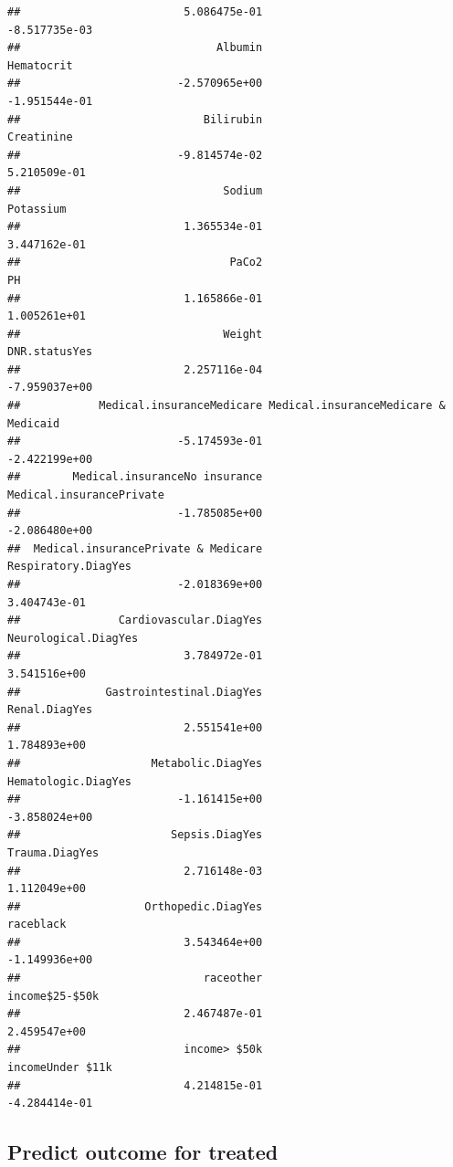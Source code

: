 \documentclass[
]{book}
\begin{document}
\begin{verbatim}
##                         5.086475e-01                        -8.517735e-03 
##                              Albumin                           Hematocrit 
##                        -2.570965e+00                        -1.951544e-01 
##                            Bilirubin                           Creatinine 
##                        -9.814574e-02                         5.210509e-01 
##                               Sodium                            Potassium 
##                         1.365534e-01                         3.447162e-01 
##                                PaCo2                                   PH 
##                         1.165866e-01                         1.005261e+01 
##                               Weight                        DNR.statusYes 
##                         2.257116e-04                        -7.959037e+00 
##            Medical.insuranceMedicare Medical.insuranceMedicare & Medicaid 
##                        -5.174593e-01                        -2.422199e+00 
##        Medical.insuranceNo insurance             Medical.insurancePrivate 
##                        -1.785085e+00                        -2.086480e+00 
##  Medical.insurancePrivate & Medicare                  Respiratory.DiagYes 
##                        -2.018369e+00                         3.404743e-01 
##               Cardiovascular.DiagYes                 Neurological.DiagYes 
##                         3.784972e-01                         3.541516e+00 
##             Gastrointestinal.DiagYes                        Renal.DiagYes 
##                         2.551541e+00                         1.784893e+00 
##                    Metabolic.DiagYes                  Hematologic.DiagYes 
##                        -1.161415e+00                        -3.858024e+00 
##                       Sepsis.DiagYes                       Trauma.DiagYes 
##                         2.716148e-03                         1.112049e+00 
##                   Orthopedic.DiagYes                            raceblack 
##                         3.543464e+00                        -1.149936e+00 
##                            raceother                       income$25-$50k 
##                         2.467487e-01                         2.459547e+00 
##                         income> $50k                     incomeUnder $11k 
##                         4.214815e-01                        -4.284414e-01
\end{verbatim}

\hypertarget{predict-outcome-for-treated}{%
\subsection{Predict outcome for treated}\label{predict-outcome-for-treated}}
\end{document}
